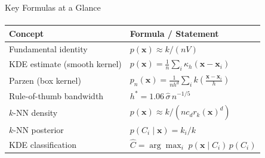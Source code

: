 \begin{frame}{Key Formulas at a Glance}
  \framesubtitle{}
  \renewcommand{\arraystretch}{1.5}
  \begin{center}
  \begin{tabular}{ll}
    \toprule
    \textbf{Concept} & \textbf{Formula / Statement} \\
    \midrule
    Fundamental identity & $p(\mathbf{x}) \approx k/(nV)$ \\
    KDE estimate (smooth kernel) & $p(\mathbf{x}) = \frac{1}{n}\sum_i\kappa_h(\mathbf{x}-\mathbf{x}_i)$ \\
    Parzen (box kernel) & $p_n(\mathbf{x}) = \frac{1}{nh^d}\sum_i k\!\left(\frac{\mathbf{x}-\mathbf{x}_i}{h}\right)$ \\
    Rule-of-thumb bandwidth & $h^* = 1.06\,\hat\sigma\,n^{-1/5}$ \\
    $k$-NN density & $p(\mathbf{x})\approx k/(n c_d r_k(\mathbf{x})^d)$ \\
    $k$-NN posterior & $p(C_i\mid\mathbf{x}) = k_i/k$ \\
    KDE classification & $\hat C = \arg\max_i\; p(\mathbf{x}\mid C_i)\,p(C_i)$ \\
    \bottomrule
  \end{tabular}
  \end{center}
\end{frame}

